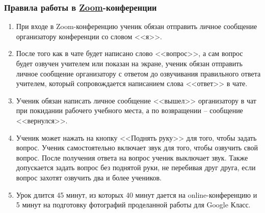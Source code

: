 \documentclass[geometry,a5paper]{pum}
\date{11.04.20}
\begin{document}


\subsubsection*{Правила работы в \href{https://zoom.us}{Zoom}-конференции}
\begin{enumerate}[nosep]
  \item При входе в Zoom-конференцию ученик обязан отправить личное сообщение организатору конференции со словом <<я>>.
  \item После того как в чате будет написано слово <<вопрос>>, а сам вопрос будет озвучен учителем или показан на экране, ученик обязан отправить личное сообщение организатору с ответом до озвучивания правильного ответа учителем, который сопровождается написанием слова <<ответ>> в чате.
  \item Ученик обязан написать личное сообщение <<вышел>> организатору в чат при покидании рабочего учебного места, а по возвращении -- сообщение <<вернулся>>.
  \item Ученик может нажать на кнопку <<Поднять руку>> для того, чтобы задать вопрос. Ученик самостоятельно включает звук для того, чтобы озвучить свой вопрос. После получения ответа на вопрос ученик выключает звук. Также допускается задать вопрос без поднятой руки, не перебивая друг друга, если вопрос захотят озвучить два и более учеников.
  \item Урок длится 45 минут, из которых 40 минут дается на online-конференцию и 5 минут на подготовку фотографий проделанной работы для Google Класс.
\end{enumerate}

\vspace{-0.3cm}
\end{document}
